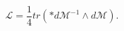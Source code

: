 \begin{equation}
 \mathcal{L}=\frac{1}{4}tr(\ast d\mathcal{M}^{-1}\wedge d\mathcal{M}).
\end{equation}

